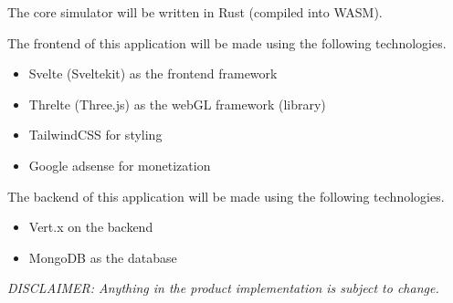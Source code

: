 \documentclass[12pt]{article}
\begin{document}
The core simulator will be written in Rust (compiled into WASM).

The frontend of this application will be made using the following technologies.\\
\begin{itemize}
    \item Svelte (Sveltekit) as the frontend framework
    \item Threlte (Three.js) as the webGL framework (library)
    \item TailwindCSS for styling
    \item Google adsense for monetization
\end{itemize}
The backend of this application will be made using the following technologies.\\
\begin{itemize}
    \item Vert.x on the backend
    \item MongoDB as the database
\end{itemize}

\textit{DISCLAIMER: Anything in the product implementation is subject to change.}
\end{document}
